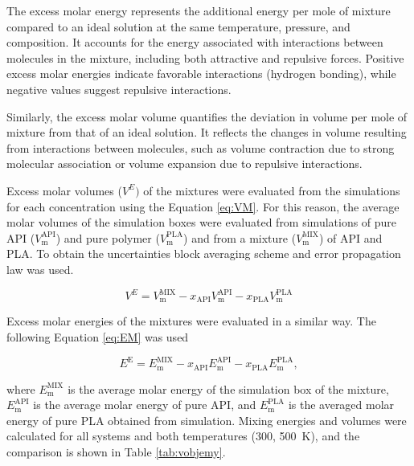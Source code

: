 The excess molar energy represents the additional energy per mole of mixture compared to an ideal solution at the same temperature, pressure, and composition. It accounts for the energy associated with interactions between molecules in the mixture, including both attractive and repulsive forces. Positive excess molar energies indicate favorable interactions (hydrogen bonding), while negative values suggest repulsive interactions.

Similarly, the excess molar volume quantifies the deviation in volume per mole of mixture from that of an ideal solution. It reflects the changes in volume resulting from interactions between molecules, such as volume contraction due to strong molecular association or volume expansion due to repulsive interactions.

Excess molar volumes ($V^{E})$ of the mixtures were evaluated from the simulations for each concentration using the Equation \ref{eq:VM}. For this reason, the average molar volumes of the simulation boxes were evaluated from simulations of pure API ($V_{\text{m}}^{\text{API}} $) and pure polymer ($V_{\text{m}}^{\text{PLA}}$) and from a mixture ($V_{\text{m}}^{\text{MIX}}$) of API and PLA. To obtain the uncertainties block averaging scheme and error propagation law was used.  

\begin{equation}\label{eq:VM}
	V^{E} = V_{\text{m}}^{\text{MIX}} - x_{\text{API}} V_{\text{m}}^{\text{API}} - x_{\text{PLA}} V_{\text{m}}^{\text{PLA}}
\end{equation}

Excess molar energies of the mixtures were evaluated in a similar way. The following Equation \ref{eq:EM} was used

\begin{equation}\label{eq:EM}
	E^\text{E} = E_{\text{m}}^{\text{MIX}} - x_{\text{API}} E_{\text{m}}^{\text{API}} - x_{\text{PLA}} E_{\text{m}}^{\text{PLA}},
\end{equation}

where $E_{\text{m}}^{\text{MIX}}$ is the average molar energy of the simulation box of the mixture, $E_{\text{m}}^{\text{API}}$ is the average molar energy of pure API, and $E_{\text{m}}^{\text{PLA}}$ is the averaged molar energy of pure PLA obtained from simulation. Mixing energies and volumes were calculated for all systems and both temperatures (300, 500~K), and the comparison is shown in Table \ref{tab:vobjemy}.  

